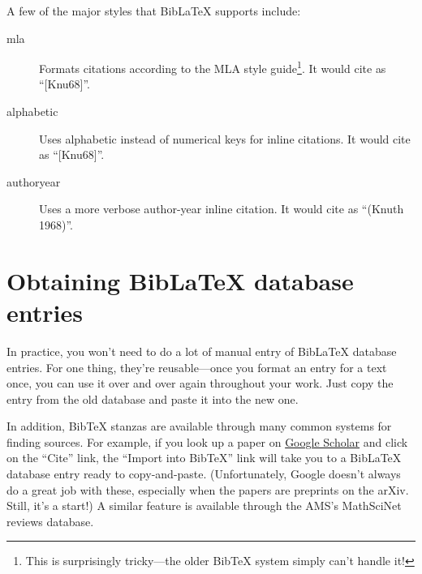\documentclass{article}
\begin{document}
A few of the major styles that Bib\LaTeX{} supports include:
\begin{description}
\item[mla]
  Formats citations according to the MLA style guide\footnote{This is surprisingly tricky---the older Bib\TeX{} system simply can't handle it!}.
  It would cite \cite{knuth:aocp} as \enquote{[Knu68]}.

\item[alphabetic]
  Uses alphabetic instead of numerical keys for inline citations.
  It would cite \cite{knuth:aocp} as \enquote{[Knu68]}.

\item[authoryear]
  Uses a more verbose author-year inline citation.
  It would cite \cite{knuth:aocp} as \enquote{(Knuth 1968)}.
\end{description}

\section{Obtaining Bib\LaTeX{} database entries}
\label{s:obtaining}
In practice, you won't need to do a lot of manual entry of Bib\LaTeX{} database entries.
For one thing, they're reusable---once you format an entry for a text once, you can use it over and over again throughout your work.
Just copy the entry from the old database and paste it into the new one.

In addition, Bib\TeX{} stanzas are available through many common systems for finding sources.
For example, if you look up a paper on \href{http://scholar.google.com}{Google Scholar} and click on the \enquote{Cite} link, the \enquote{Import into Bib\TeX{}} link will take you to a Bib\LaTeX{} database entry ready to copy-and-paste.
(Unfortunately, Google doesn't always do a great job with these, especially when the papers are preprints on the arXiv.
Still, it's a start!)
A similar feature is available through the AMS's MathSciNet reviews database.

\printbibliography
\end{document}
